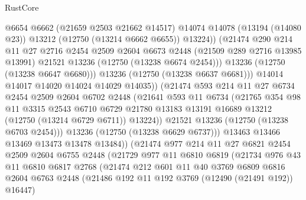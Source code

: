 \begin{lexlean}{RustCore}
\begin{coremodule}
                        @6654
                        @6662
                        (@21659 @2503 @21662 @14517)
                        @14074
                        @14078
                        (@13194 (@14080 @23))
                        @13212
                        (@12750 (@13214 @6662 @6655))
                        @13224))
                    (@21474
                      @290
                      @214
                      @11
                      @27
                      @2716
                      @2454
                      @2509
                      @2604
                      @6673
                      @2448
                      (@21509 @289 @2716 @13985 @13991)
                      @21521
                      @13236
                      (@12750 (@13238 @6674 @2454)))
                    @13236
                    (@12750 (@13238 @6647 @6680)))
                  @13236
                  (@12750 (@13238 @6637 @6681)))
                @14014
                @14017
                @14020
                @14024
                @14029
                @14035))
            (@21474
              @593
              @214
              @11
              @27
              @6734
              @2454
              @2509
              @2604
              @6702
              @2448
              (@21641
                @593
                @11
                @6734
                (@21765
                  @354
                  @98
                  @11
                  @3315
                  @2543
                  @6710
                  @6729
                  @21780
                  @13183
                  @13191
                  @16689
                  @13212
                  (@12750 (@13214 @6729 @6711))
                  @13224))
              @21521
              @13236
              (@12750 (@13238 @6703 @2454)))
            @13236
            (@12750 (@13238 @6629 @6737)))
          @13463
          @13466
          @13469
          @13473
          @13478
          @13484))
      (@21474
        @977
        @214
        @11
        @27
        @6821
        @2454
        @2509
        @2604
        @6755
        @2448
        (@21729
          @977
          @11
          @6810
          @6819
          (@21734
            @976
            @43
            @11
            @6810
            @6817
            @2768
            (@21474
              @212
              @601
              @11
              @40
              @3769
              @6809
              @6816
              @2604
              @6763
              @2448
              (@21486 @192 @11 @192 @3769 (@12490 (@21491 @192)) @16447)

\end{coremodule}
\end{lexlean}
